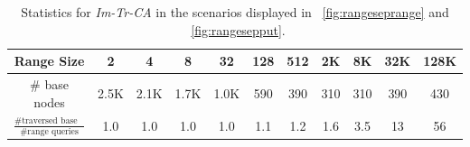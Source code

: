 \documentclass[a4paper,UKenglish]{oasics}
\begin{document}
 \begin{table}[h]%
  \caption{Statistics for \emph{Im-Tr-CA} in the scenarios displayed in \figurename~\ref{fig:rangeseprange} and \figurename~\ref{fig:rangesepput}.\label{tab:nodestats}}
      \begin{tabular}{c|cccccccccc} %
      Range Size  & 2 & 4 & 8 & 32 & 128 & 512 & 2K & 8K & 32K & 128K \\\hline
      \# base nodes & 2.5K & 2.1K & 1.7K & 1.0K & 590 & 390 & 310 & 310 & 390 & 430 \\ 
      $\frac{\text{\# traversed base nodes}}{\text{\# range queries}}$ & 1.0 & 1.0 & 1.0 & 1.0 & 1.1 & 1.2 & 1.6 & 3.5 & 13 & 56 \\ %
    \end{tabular}
\end{table} 
\end{document}
